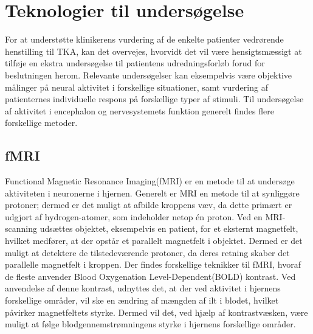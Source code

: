 \section{Teknologier til undersøgelse} %
For at understøtte klinikerens vurdering af de enkelte patienter vedrørende henstilling til TKA, kan det overvejes, hvorvidt det vil være hensigtsmæssigt at tilføje en ekstra undersøgelse til patientens udredningsforløb forud for beslutningen herom. Relevante undersøgelser kan eksempelvis være objektive målinger på neural aktivitet i forskellige situationer, samt vurdering af patienternes individuelle respons på forskellige typer af stimuli. Til undersøgelse af aktivitet i encephalon og nervesystemets funktion generelt findes flere forskellige metoder.
  
\subsection{fMRI}
Functional Magnetic Resonance Imaging(fMRI) er en metode til at undersøge aktiviteten i neuronerne i hjernen.
Generelt er MRI en metode til at synliggøre protoner; dermed er det muligt at afbilde kroppens væv, da dette primært er udgjort af hydrogen-atomer, som indeholder netop én proton.     
Ved en MRI-scanning udsættes objektet, eksempelvis en patient, for et eksternt magnetfelt, hvilket medfører, at der opstår et parallelt magnetfelt i objektet. Dermed er det muligt at detektere de tilstedeværende protoner, da deres retning skaber det parallelle magnetfelt i kroppen.\citep{Wals2009}
Der findes forskellige teknikker til fMRI, hvoraf de fleste anvender Blood Oxygenation Level-Dependent(BOLD) kontrast. Ved anvendelse af denne kontrast, udnyttes det, at der ved aktivitet i hjernens forskellige områder, vil ske en ændring af mængden af ilt i blodet, hvilket påvirker magnetfeltets styrke. Dermed vil det, ved hjælp af kontrastvæsken, være muligt at følge blodgennemstrømningens styrke i hjernens forskellige områder. \citep{Wals2009}

